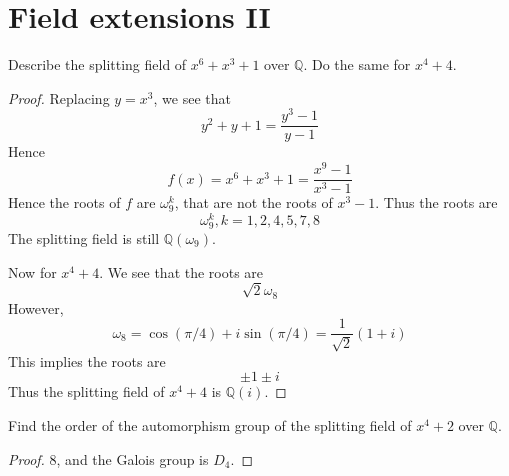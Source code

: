 \documentclass[openany]{book}
\newcommand{\Q}{\mathbb{Q}}
\newcommand{\om}{\omega}
\begin{document}
    \section{Field extensions II}

    \begin{prob}
        Describe the splitting field of \( x^6 + x^3 + 1 \) over \(\mathbb{Q}\). Do the same for \( x^4 + 4 \).
        \end{prob}
        \begin{proof}
            Replacing $y=x^3$, we see that 
            \begin{equation*}
                y^2+y+1=\frac{y^3-1}{y-1}
            \end{equation*}
            Hence 
            \begin{equation*}
                f(x)=x^6+x^3+1=\frac{x^9-1}{x^3-1}
            \end{equation*}
            Hence the roots of $f$ are $\om_9^k$, that are not the roots of $x^3-1$. Thus the roots are 
            \begin{equation*}
                \om_9^k, k=1,2,4,5,7,8
            \end{equation*}
            The splitting field is still $\Q(\om_9)$.
    
            Now for $x^4+4$. We see that the roots are 
            \begin{equation*}
                \sqrt{2}\om_8
            \end{equation*}
            However, 
            \begin{equation*}
                \om_8=\cos(\pi/4)+i\sin(\pi/4)=\frac{1}{\sqrt{2}}(1+i)
            \end{equation*}
            This implies the roots are 
            \begin{equation*}
                \pm 1\pm i
            \end{equation*}
            Thus the splitting field of $x^4+4$ is $\Q(i)$.
        \end{proof}
    
    
        
        \begin{prob}
        Find the order of the automorphism group of the splitting field of \( x^4 + 2 \) over \(\mathbb{Q}\).
        \end{prob}
        \begin{proof}
            $8$, and the Galois group is $D_4$.
        \end{proof}
        
\end{document}
